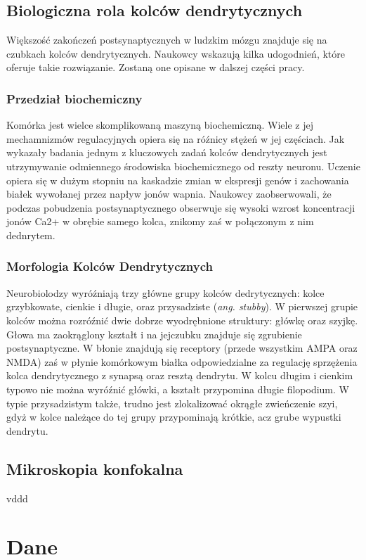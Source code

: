 \documentclass{article}
\begin{document}
\subsection{Biologiczna rola kolców dendrytycznych}
Większość zakończeń postsynaptycznych %
w ludzkim mózgu znajduje się na czubkach kolców dendrytycznych.
Naukowcy wskazują kilka udogodnień, które oferuje takie rozwiązanie.
Zostaną one opisane w dalszej części pracy.
\subsubsection{Przedział biochemiczny}
Komórka jest wielce skomplikowaną maszyną biochemiczną. 
Wiele z jej mechamnizmów regulacyjnych opiera się na róźnicy stężeń w jej częściach. 
Jak wykazały badania %
jednym z kluczowych zadań kolców dendrytycznych jest utrzymywanie odmiennego środowiska biochemicznego od reszty neuronu.
Uczenie opiera się w dużym stopniu na kaskadzie zmian w ekspresji genów i zachowania białek wywołanej przez napływ jonów wapnia.
Naukowcy zaobserwowali, że podczas pobudzenia postsynaptycznego obserwuje się wysoki wzrost koncentracji jonów Ca2+ %
w obrębie samego kolca, znikomy zaś w połączonym z nim dednrytem. 
\subsubsection{Morfologia Kolców Dendrytycznych}
Neurobiolodzy wyróźniają trzy główne grupy kolców dedrytycznych: kolce grzybkowate, cienkie i długie, oraz przysadziste (\emph{ang. stubby}).
W pierwszej grupie kolców można rozróźnić dwie dobrze wyodrębnione struktury: główkę oraz szyjkę.
Głowa ma zaokrąglony kształt i na jejczubku znajduje się zgrubienie postsynaptyczne.
W błonie znajdują się receptory (przede wszystkim AMPA oraz NMDA) zaś w płynie komórkowym białka odpowiedzialne za regulację sprzężenia kolca dendrytycznego z synapsą oraz resztą dendrytu. %
W kolcu długim i cienkim typowo nie można wyróźnić główki, a kształt przypomina długie filopodium.
W typie przysadzistym także, trudno jest zlokalizować okrągłe zwieńczenie szyi, gdyż w kolce należące do tej grupy przypominają krótkie, acz grube wypustki dendrytu. %


\subsection{Mikroskopia konfokalna}
vddd

\section{Dane}
\end{document}
